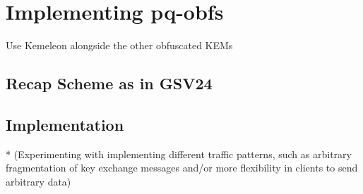 \chapter{Implementing pq-obfs}\label{ch:tbd}

Use Kemeleon alongside the other obfuscated KEMs

\section{Recap Scheme as in GSV24} \label{sec:tbd}

\section{Implementation} \label{sec:tbd}

* (Experimenting with implementing different traffic patterns, such as arbitrary fragmentation of key
exchange messages and/or more flexibility in clients to send arbitrary data)